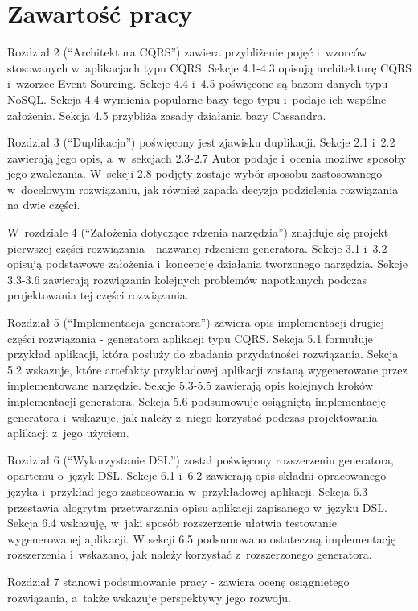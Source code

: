 \section{Zawartość pracy}

Rozdział 2 (``Architektura CQRS'') zawiera przybliżenie pojęć i~wzorców stosowanych w~aplikacjach typu CQRS.
Sekcje 4.1-4.3 opisują architekturę CQRS i~wzorzec Event Sourcing.
Sekcje 4.4 i~4.5 poświęcone są bazom danych typu NoSQL.
Sekcja 4.4 wymienia popularne bazy tego typu i~podaje ich wspólne założenia.
Sekcja 4.5 przybliża zasady działania bazy Cassandra.

Rozdział 3 (``Duplikacja'') poświęcony jest zjawisku duplikacji.
Sekcje 2.1 i~2.2 zawierają jego opis, a~w~sekcjach 2.3-2.7 Autor podaje i~ocenia możliwe sposoby jego zwalczania.
W~sekcji 2.8 podjęty zostaje wybór sposobu zastosowanego w~docelowym rozwiązaniu, jak również zapada decyzja podzielenia rozwiązania na dwie części.

W~rozdziale 4 (``Założenia dotyczące rdzenia narzędzia'') znajduje się projekt pierwszej części rozwiązania - nazwanej rdzeniem generatora.
Sekcje 3.1 i~3.2 opisują podstawowe założenia i~koncepcję działania tworzonego narzędzia.
Sekcje 3.3-3.6 zawierają rozwiązania kolejnych problemów napotkanych podczas projektowania tej części rozwiązania.

Rozdział 5 (``Implementacja generatora'') zawiera opis implementacji drugiej części rozwiązania - generatora aplikacji typu CQRS.
Sekcja 5.1 formułuje przykład aplikacji, która posłuży do zbadania przydatności rozwiązania.
Sekcja 5.2 wskazuje, które artefakty przykładowej aplikacji zostaną wygenerowane przez implementowane narzędzie.
Sekcje 5.3-5.5 zawierają opis kolejnych kroków implementacji generatora.
Sekcja 5.6 podsumowuje osiągniętą implementację generatora i~wskazuje, jak należy z~niego korzystać podczas projektowania aplikacji z~jego użyciem.

Rozdział 6 (``Wykorzystanie DSL'') został poświęcony rozszerzeniu generatora, opartemu o~język DSL.
Sekcje 6.1 i~6.2 zawierają opis składni opracowanego języka i~przykład jego zastosowania w~przykładowej aplikacji.
Sekcja 6.3 przestawia alogrytm przetwarzania opisu aplikacji zapisanego w~języku DSL.
Sekcja 6.4 wskazuję, w~jaki sposób rozszerzenie ułatwia testowanie wygenerowanej aplikacji.
W sekcji 6.5 podsumowano ostateczną implementację rozszerzenia i~wskazano, jak należy korzystać z~rozszerzonego generatora.

Rozdział 7 stanowi podsumowanie pracy - zawiera ocenę osiągniętego rozwiązania, a~także wskazuje perspektywy jego rozwoju.
